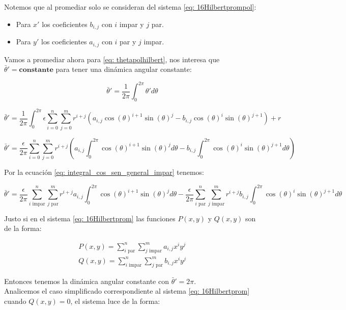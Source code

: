 Notemos que al promediar solo se consideran del sistema \eqref{eq: 16Hilbertprompol}:
\begin{itemize}
	\item Para $x'$ los coeficientes $b_{i,j}$ con $i$ impar y $j$ par.
	\item Para $y'$ los coeficientes $a_{i,j}$ con $i$ par y $j$ impar.
\end{itemize}

Vamos a promediar ahora para \eqref{eq: thetapolhilbert}, nos interesa que $\bar{\theta}'=\textbf{constante}$ para tener una dinámica angular constante:

\[
\bar{\theta}'=\frac{1}{2\pi}\int_{0}^{2\pi}\theta'd\theta
\]

\[
\bar{\theta}'=\frac{1}{2\pi}\int_{0}^{2\pi}\epsilon\sum_{i=0}^{n}\sum_{j=0}^{m}r^{i+j}(a_{i,j}\cos(\theta)^{i+1}\sin(\theta)^j-b_{i,j}\cos(\theta)^{i}\sin(\theta)^{j+1})+r
\]

\[
\bar{\theta}'=\frac{\epsilon}{2\pi}\sum_{i=0}^{n}\sum_{j=0}^{m}r^{i+j}\left(a_{i,j}\int_{0}^{2\pi}\cos(\theta)^{i+1}\sin(\theta)^j d\theta-b_{i,j}\int_{0}^{2\pi}\cos(\theta)^{i}\sin(\theta)^{j+1} d\theta\right)
\]

Por la ecuación \eqref{eq: integral_cos_sen_general_impar} tenemos:

\[
\bar{\theta}'=\frac{\epsilon}{2\pi}\sum_{i \text{ impar}}^{n}\sum_{j \text{ par}}^{m}r^{i+j}a_{i,j}\int_{0}^{2\pi}\cos(\theta)^{i+1}\sin(\theta)^j d\theta-\frac{\epsilon}{2\pi}\sum_{i \text{ par}}^{n}\sum_{j \text{ impar}}^{m}r^{i+j}b_{i,j}\int_{0}^{2\pi}\cos(\theta)^{i}\sin(\theta)^{j+1} d\theta
\]

Justo si en el sistema \eqref{eq: 16Hilbertprom} las funciones $P(x,y)$ y $Q(x,y)$ son de la forma:

\begin{equation}\label{eq: 16HilbertPromPol}
	\begin{matrix}
		P(x,y) = \sum_{i \text{ par}}^{n} \sum_{j \text{ impar}}^{m} a_{i,j} x^i y^j \\
		Q(x,y) = \sum_{i \text{ impar}}^{n} \sum_{j \text{ par}}^{m} b_{i,j} x^i y^j
	\end{matrix}
\end{equation}

Entonces tenemos la dinámica angular constante con $\bar{\theta}'=2\pi$.\\

Analicemos el caso simplificado correspondiente al sistema \eqref{eq: 16Hilbertprom} cuando $Q(x,y)=0$, el sistema luce de la forma:

